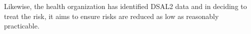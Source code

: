 \begin{minipage}[t]{0.79\textwidth}
  Likewise, the health organization has identified DSAL2 data and in deciding to \gls{treat} the risk, it aims to ensure risks are reduced as low as reasonably practicable. 
\end{minipage}
\begin{minipage}[t]{0.2\textwidth}
  \centering{}
\end{minipage}

